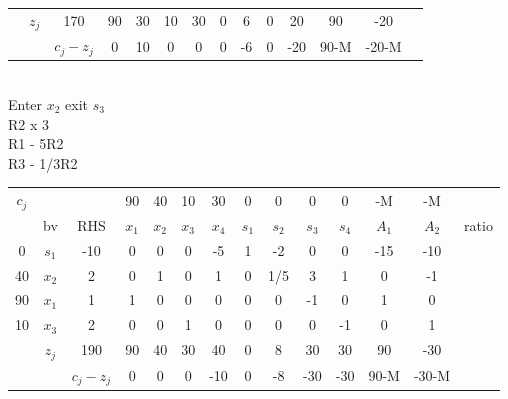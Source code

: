 \documentclass[answers]{exam}
\begin{document}
\begin{questions}
\begin{solution}
\begin{parts}
\begin{tabular}{cccccccccccccc}
		& \multicolumn{1}{c|}{$z_j$} & \multicolumn{1}{c|}{170}       & 90    & 30    & 10    & 30    & 0     & 6     & 0     & 20    & 90    & -20   &               \\ \cline{3-13}
		&                            & \multicolumn{1}{c|}{$c_j-z_j$} & 0     & 10    & 0     & 0     & 0     & -6    & 0     & -20   & 90-M  & -20-M &              
	\end{tabular} \\
	Enter $x_2$ exit $s_3$ \\
	R2 x 3 \\
	R1 - 5R2 \\
	R3 - 1/3R2 \\
	\begin{tabular}{cccccccccccccc}
		$c_j$                   &                            &                                & 90    & 40    & 10    & 30    & 0     & 0     & 0     & 0     & -M    & -M    &       \\
		\multicolumn{1}{c|}{}   & \multicolumn{1}{c|}{bv}    & \multicolumn{1}{c|}{RHS}       & $x_1$ & $x_2$ & $x_3$ & $x_4$ & $s_1$ & $s_2$ & $s_3$ & $s_4$ & $A_1$ & $A_2$ & ratio \\ \cline{1-13}
		\multicolumn{1}{c|}{0}  & \multicolumn{1}{c|}{$s_1$} & \multicolumn{1}{c|}{-10}       & 0     & 0     & 0     & -5    & 1     & -2    & 0     & 0     & -15   & -10   &       \\
		\multicolumn{1}{c|}{40} & \multicolumn{1}{c|}{$x_2$} & \multicolumn{1}{c|}{2}         & 0     & 1     & 0     & 1     & 0     & 1/5   & 3     & 1     & 0     & -1    &       \\
		\multicolumn{1}{c|}{90} & \multicolumn{1}{c|}{$x_1$} & \multicolumn{1}{c|}{1}         & 1     & 0     & 0     & 0     & 0     & 0     & -1    & 0     & 1     & 0     &       \\
		\multicolumn{1}{c|}{10} & \multicolumn{1}{c|}{$x_3$} & \multicolumn{1}{c|}{2}         & 0     & 0     & 1     & 0     & 0     & 0     & 0     & -1    & 0     & 1     &       \\ \cline{1-13}
		& \multicolumn{1}{c|}{$z_j$} & \multicolumn{1}{c|}{190}       & 90    & 40    & 30    & 40    & 0     & 8     & 30    & 30    & 90    & -30   &       \\ \cline{3-13}
		&                            & \multicolumn{1}{c|}{$c_j-z_j$} & 0     & 0     & 0     & -10   & 0     & -8    & -30   & -30   & 90-M  & -30-M &      
	\end{tabular} \\


\end{parts}
\end{solution}
\end{questions}
\end{document}
